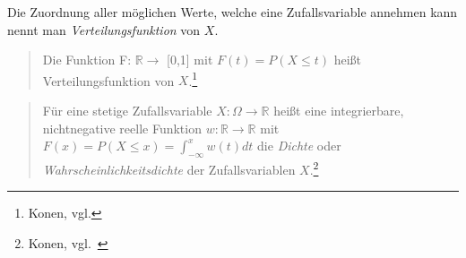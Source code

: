 Die Zuordnung aller möglichen Werte, welche eine Zufallsvariable annehmen kann nennt man \emph{Verteilungsfunktion} von $X$.

\begin{quotation}
Die Funktion F: $\mathbb{R} \rightarrow$ [0,1] mit $F(t) = P (X \le t)$ heißt Verteilungsfunktion von $X$.\footnote{Konen, vgl.}
\end{quotation}

\begin{quotation}
Für eine stetige Zufallsvariable $X: \Omega \rightarrow \mathbb{R}$ heißt eine integrierbare, nichtnegative reelle Funktion $w: \mathbb{R} \rightarrow \mathbb{R}$ mit $F(x) = P(X \le x) = \int_{-\infty}^{x} w(t)dt$ die \emph{Dichte} oder \emph{Wahrscheinlichkeitsdichte} der Zufallsvariablen $X$.\footnote{Konen, vgl.~}
\end{quotation}
